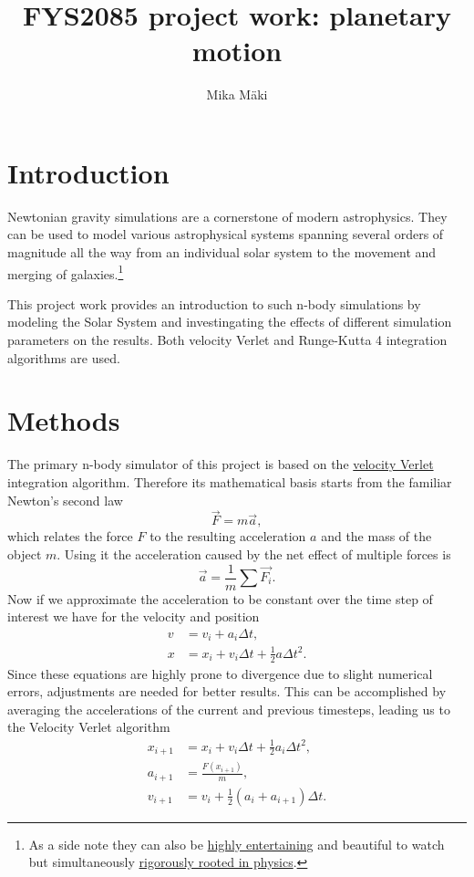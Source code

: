 \documentclass[a4paper]{article}
\title{FYS2085 project work: planetary motion}
\author{Mika Mäki}
\begin{document}
\maketitle
\tableofcontents

\section*{Introduction}
Newtonian gravity simulations are a cornerstone of modern astrophysics.
They can be used to model various astrophysical systems spanning several orders of magnitude all the way from an individual solar system to the movement and merging of galaxies.\footnote{
As a side note they can also be
\href{https://www.kerbalspaceprogram.com/}{highly entertaining} and beautiful to watch but simultaneously \href{https://xkcd.com/1356/}{rigorously rooted in physics}.
}

This project work provides an introduction to such n-body simulations by modeling the Solar System and investingating the effects of different simulation parameters on the results.
Both velocity Verlet and Runge-Kutta 4 integration algorithms are used.



\clearpage
\section{Methods}
The primary n-body simulator of this project is based on the
\href{https://en.wikipedia.org/wiki/Verlet_integration#Velocity_Verlet}{velocity Verlet} integration algorithm.
Therefore its mathematical basis starts from the familiar Newton's second law
\begin{equation}
\vec{F} = m \vec{a},
\end{equation}
which relates the force $F$ to the resulting acceleration $a$ and the mass of the object $m$.
Using it the acceleration caused by the net effect of multiple forces is
\begin{equation}
\vec{a} = \frac{1}{m} \sum \vec{F_i}.
\end{equation}
Now if we approximate the acceleration to be constant over the time step of interest we have for the velocity and position
\begin{align}
v &= v_i + a_i \Delta t, \\
x &= x_i + v_i \Delta t + \frac{1}{2} a \Delta t^2.
\end{align}
Since these equations are highly prone to divergence due to slight numerical errors, adjustments are needed for better results.
This can be accomplished by averaging the accelerations of the current and previous timesteps, leading us to the Velocity Verlet algorithm
\begin{align}
x_{i+1} &= x_i + v_i \Delta t + \frac{1}{2} a_i \Delta t^2, \\
a_{i+1} &= \frac{F(x_{i+1})}{m}, \\
v_{i+1} &= v_i + \frac{1}{2}(a_i + a_{i+1}) \Delta t.
\end{align}
\end{document}
